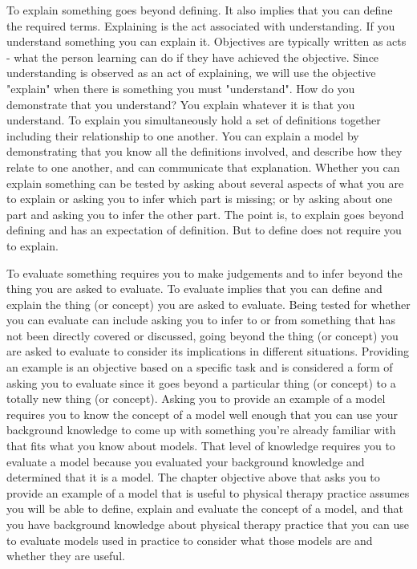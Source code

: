 To explain something goes beyond defining. It also implies that you can define the required terms. Explaining is the act associated with understanding. If you understand something you can explain it. Objectives are typically written as acts - what the person learning can do if they have achieved the objective. Since understanding is observed as an act of explaining, we will use the objective "explain" when there is something you must "understand". How do you demonstrate that you understand? You explain whatever it is that you understand. To explain you simultaneously hold a set of definitions together including their relationship to one another. You can explain a model by demonstrating that you know all the definitions involved, and describe how they relate to one another, and can communicate that explanation. Whether you can explain something can be tested by asking about several aspects of what you are to explain or asking you to infer which part is missing; or by asking about one part and asking you to infer the other part. The point is, to explain goes beyond defining and has an expectation of definition. But to define does not require you to explain. 

To evaluate something requires you to make judgements and to infer beyond the thing you are asked to evaluate. To evaluate implies that you can define and explain the thing (or concept) you are asked to evaluate. Being tested for whether you can evaluate can include asking you to infer to or from something that has not been directly covered or discussed, going beyond the thing (or concept)\footnotemark{} you are asked to evaluate to consider its implications in different situations. Providing an example is an objective based on a specific task and is considered a form of asking you to evaluate since it goes beyond a particular thing (or concept) to a totally new thing (or concept). Asking you to provide an example of a model requires you to know the concept of a model well enough that you can use your background knowledge to come up with something you're already familiar with that fits what you know about models. That level of knowledge requires you to evaluate a model because you evaluated your background knowledge and determined that it is a model. The chapter objective above that asks you to provide an example of a model that is useful to physical therapy practice assumes you will be able to define, explain and evaluate the concept of a model, and that you have background knowledge about physical therapy practice that you can use to evaluate models used in practice to consider what those models are and whether they are useful. 

